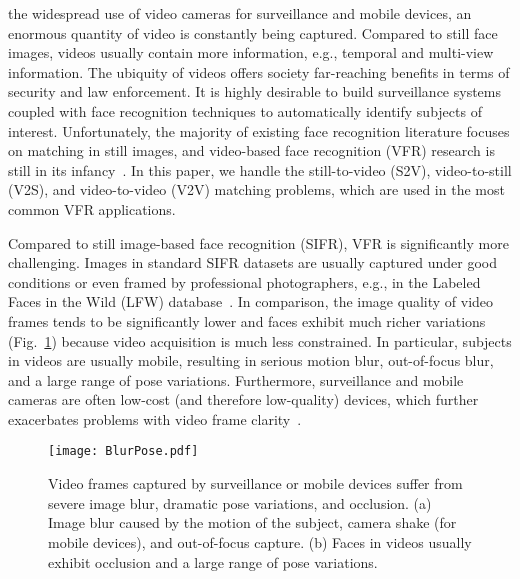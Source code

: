 \documentclass[10pt,journal,cspaper,compsoc]{IEEEtran}
\begin{document}
%
%
%
%

 the widespread use of video cameras for surveillance and mobile devices, an enormous quantity of video is constantly being captured.
Compared to still face images, videos usually contain more information, e.g., temporal and multi-view information.
The ubiquity of videos offers society far-reaching benefits in terms of security and law enforcement.
It is highly desirable to build surveillance systems coupled with face recognition techniques to automatically identify subjects of interest.
Unfortunately, the majority of existing face recognition literature focuses on matching in still images,
and video-based face recognition (VFR) research is still in its infancy~\cite{Huang2015Benchmark,best2013video}.
In this paper, we handle the still-to-video (S2V), video-to-still (V2S), and video-to-video (V2V) matching problems,
which are used in the most common VFR applications.

Compared to still image-based face recognition (SIFR), VFR is significantly more challenging.
Images in standard SIFR datasets are usually captured under good conditions or even framed by professional photographers, e.g., in the Labeled Faces in the Wild (LFW) database~\cite{LFWTech}.
In comparison, the image quality of video frames tends to be significantly lower and faces exhibit much richer variations (Fig.~\ref{fig:BlurPose})
because video acquisition is much less constrained.
In particular, subjects in videos are usually mobile, resulting in serious motion blur, out-of-focus blur, and a large range of pose variations.
Furthermore, surveillance and mobile cameras are often low-cost (and therefore low-quality) devices, which further exacerbates problems with video frame clarity~\cite{biswas2013pose}.

\begin{figure}
\centering
\texttt{[image: BlurPose.pdf]}
\caption{Video frames captured by surveillance or mobile devices suffer from severe image blur, dramatic pose variations, and occlusion.
(a) Image blur caused by the motion of the subject, camera shake (for mobile devices), and out-of-focus capture.
(b) Faces in videos usually exhibit occlusion and a large range of pose variations.
}
\label{fig:BlurPose}
\end{figure}
\end{document}
